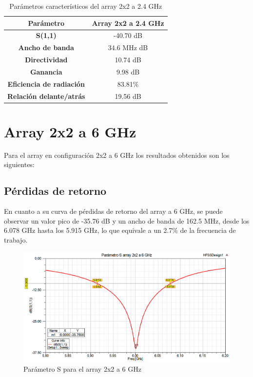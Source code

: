 \begin{table}[H]
  
   
   \small %
   \centering %
   \begin{tabular}{c c} %
   \toprule[\heavyrulewidth]\toprule[\heavyrulewidth]
   \textbf{Parámetro} & \textbf{Array 2x2 a 2.4 GHz} \\ 
   \midrule
   \textbf{S(1,1)} & -40.70 dB \\
   \textbf{Ancho de banda} & 34.6 MHz dB \\
   \textbf{Directividad} & 10.74 dB \\
   \textbf{Ganancia} & 9.98 dB \\
   \textbf{Eficiencia de radiación} & 83.81\% \\
   \textbf{Relación delante/atrás} & 19.56 dB \\

   \bottomrule[\heavyrulewidth] 
   \end{tabular}
   
   \caption{Parámetros característicos del array 2x2 a 2.4 GHz} 
   \label{tab:res2x21}
\end{table}












\section{Array 2x2 a 6 GHz}
\par Para el array en configuración 2x2 a 6 GHz los resultados obtenidos son los siguientes:

\subsection{Pérdidas de retorno}
\par En cuanto a su curva de pérdidas de retorno del array a 6 GHz, se puede observar un valor pico de -35.76 dB y un ancho de banda de 162.5 MHz, desde los 6.078 GHz hasta los 5.915 GHz, lo que equivale a un 2.7\% de la frecuencia de trabajo.
\\
\begin{figure}[H]
    \centering
        \includegraphics[width=\textwidth]{archivos/analisis/2x22/1}
        \caption{Parámetro S para el array 2x2 a 6 GHz}
        \label{fig:s2x22}
\end{figure}

